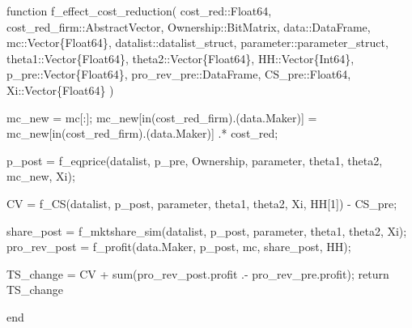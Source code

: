 \documentclass[
  letterpaper,
  DIV=11,
  numbers=noendperiod]{scrreprt}
\newenvironment{Shaded}{\begin{snugshade}}{\end{snugshade}}
\newcommand{\ControlFlowTok}[1]{\textcolor[rgb]{0.00,0.23,0.31}{#1}}
\newcommand{\DataTypeTok}[1]{\textcolor[rgb]{0.68,0.00,0.00}{#1}}
\newcommand{\FloatTok}[1]{\textcolor[rgb]{0.68,0.00,0.00}{#1}}
\newcommand{\FunctionTok}[1]{\textcolor[rgb]{0.28,0.35,0.67}{#1}}
\newcommand{\KeywordTok}[1]{\textcolor[rgb]{0.00,0.23,0.31}{#1}}
\newcommand{\NormalTok}[1]{\textcolor[rgb]{0.00,0.23,0.31}{#1}}
\newcommand{\OperatorTok}[1]{\textcolor[rgb]{0.37,0.37,0.37}{#1}}
\begin{document}
\begin{Shaded}
\begin{Highlighting}[]
\KeywordTok{function} \FunctionTok{f\_effect\_cost\_reduction}\NormalTok{(}
\NormalTok{        cost\_red}\OperatorTok{::}\DataTypeTok{Float64}\NormalTok{,}
\NormalTok{        cost\_red\_firm}\OperatorTok{::}\DataTypeTok{AbstractVector}\NormalTok{,}
\NormalTok{        Ownership}\OperatorTok{::}\DataTypeTok{BitMatrix}\NormalTok{,}
\NormalTok{        data}\OperatorTok{::}\DataTypeTok{DataFrame}\NormalTok{,}
\NormalTok{        mc}\OperatorTok{::}\DataTypeTok{Vector\{Float64\}}\NormalTok{,}
\NormalTok{        datalist}\OperatorTok{::}\DataTypeTok{datalist\_struct}\NormalTok{,}
\NormalTok{        parameter}\OperatorTok{::}\DataTypeTok{parameter\_struct}\NormalTok{,}
\NormalTok{        theta1}\OperatorTok{::}\DataTypeTok{Vector\{Float64\}}\NormalTok{,}
\NormalTok{        theta2}\OperatorTok{::}\DataTypeTok{Vector\{Float64\}}\NormalTok{,}
\NormalTok{        HH}\OperatorTok{::}\DataTypeTok{Vector\{Int64\}}\NormalTok{,}
\NormalTok{        p\_pre}\OperatorTok{::}\DataTypeTok{Vector\{Float64\}}\NormalTok{,}
\NormalTok{        pro\_rev\_pre}\OperatorTok{::}\DataTypeTok{DataFrame}\NormalTok{,}
\NormalTok{        CS\_pre}\OperatorTok{::}\DataTypeTok{Float64}\NormalTok{,}
\NormalTok{        Xi}\OperatorTok{::}\DataTypeTok{Vector\{Float64\}}
\NormalTok{    )}
   
\NormalTok{    mc\_new }\OperatorTok{=}\NormalTok{ mc[}\OperatorTok{:}\NormalTok{];}
\NormalTok{    mc\_new[}\FunctionTok{in}\NormalTok{(cost\_red\_firm).(data.Maker)] }\OperatorTok{=}\NormalTok{ mc\_new[}\FunctionTok{in}\NormalTok{(cost\_red\_firm).(data.Maker)] }\OperatorTok{.*}\NormalTok{ cost\_red;}
    
\NormalTok{    p\_post }\OperatorTok{=} \FunctionTok{f\_eqprice}\NormalTok{(datalist, p\_pre, Ownership, parameter, theta1, theta2, mc\_new, Xi);}
    
\NormalTok{    CV }\OperatorTok{=} \FunctionTok{f\_CS}\NormalTok{(datalist, p\_post, parameter, theta1, theta2, Xi, HH[}\FloatTok{1}\NormalTok{]) }\OperatorTok{{-}}\NormalTok{ CS\_pre;}
    
\NormalTok{    share\_post }\OperatorTok{=} \FunctionTok{f\_mktshare\_sim}\NormalTok{(datalist, p\_post, parameter, theta1, theta2, Xi);}
\NormalTok{    pro\_rev\_post }\OperatorTok{=} \FunctionTok{f\_profit}\NormalTok{(data.Maker, p\_post, mc, share\_post, HH);}
    
\NormalTok{    TS\_change }\OperatorTok{=}\NormalTok{ CV }\OperatorTok{+} \FunctionTok{sum}\NormalTok{(pro\_rev\_post.profit }\OperatorTok{.{-}}\NormalTok{ pro\_rev\_pre.profit);}
    \ControlFlowTok{return}\NormalTok{ TS\_change}
    
\KeywordTok{end}
\end{Highlighting}
\end{Shaded}
\end{document}
